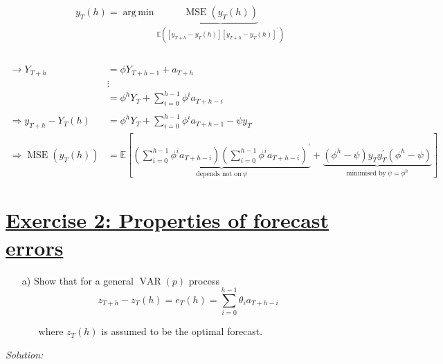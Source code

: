 \documentclass[12pt,a4paper]{article}
\DeclareMathOperator*{\argmin}{arg\,min}
\newcommand{\MSE}{\operatorname{MSE}} %
\newcommand{\VAR}{\operatorname{VAR}} %
\newcommand{\tmpsection}[1]{}
\let\tmpsection=\section
\renewcommand{\section}[1]{\tmpsection{\underline{#1}} }
\begin{document}
\begin{align*}
  y_T (h) = \argmin \underbrace{\MSE(y_T (h))}_{\mathbb{E} \left( \left[y_{T+h} - y_T (h) \right] \left[y_{T+h} - y_T (h) \right]^{'} \right)}\\
\end{align*}\\
\begin{align*}  
  \rightarrow Y_{T+h} & = \phi Y_{T+ h -1} + a_{T+h}\\
  & \vdots\\
  & = \phi^h  Y_T + \sum_{i = 0}^{h -1} \phi^i a_{T+h-i}\\
  \\
  \Rightarrow y_{T+ h} - Y_T (h) & = \phi^h Y_T + \sum_{i = 0}^{h -1} \phi^i a_{T + h -1} - \psi y_T\\
  \Rightarrow \MSE(y_T (h)) & = \mathbb{E} \left[ \underbrace{\left( \sum_{i = 0}^{h-1} \phi^i a_{T+h-i}  \right) \left( \sum_{i = 0}^{h-1} \phi^i a_{T+h-i}  \right)^{'} }_{\text{depends not on} \ \psi}       + \underbrace{\left(\phi^h - \psi \right)y_T y_T^{'} \left(\phi^h - \psi \right)}_{\text{minimised by} \ \psi = \phi^h} \right]
\end{align*}

\hypertarget{exercise-2-properties-of-forecast-errors}{%
\section{Exercise 2: Properties of forecast
errors}\label{exercise-2-properties-of-forecast-errors}}

\begin{itemize}
  \item[a)] Show that for a general $\VAR(p)$ process
  \[z_{T+h} - z_T (h) = e_T (h) = \sum_{i = 0}^{h -1} \theta_i a_{T + h -i}\]
  \begin{itemize}
    \item[] where $z_T (h)$ is assumed to be the optimal forecast.
  \end{itemize}
\end{itemize}

\emph{Solution:}
\end{document}
